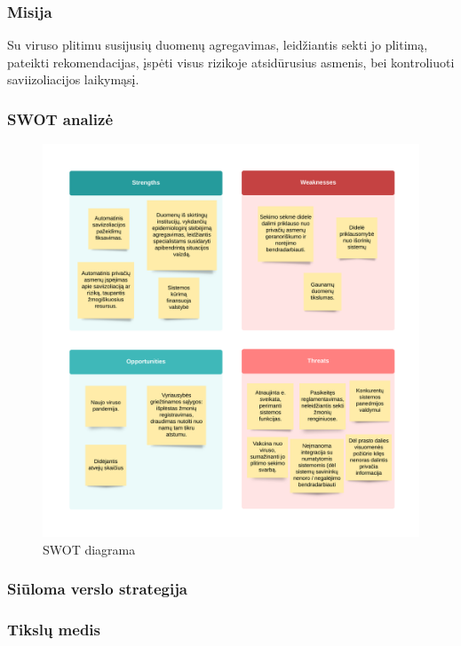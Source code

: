 \documentclass{VUMIFPSkursinis}
\begin{document}
\subsubsection{Misija}
Su viruso plitimu susijusių duomenų agregavimas, leidžiantis sekti jo plitimą, pateikti rekomendacijas,
įspėti visus rizikoje atsidūrusius asmenis, bei kontroliuoti saviizoliacijos laikymąsį.

\subsubsection{SWOT analizė}

\begin{figure}[H]
    \centering
    \includegraphics[scale=0.7]{img/SWOT.png}
    \caption{SWOT diagrama}
    \label{img:swot_diagram}
\end{figure}

\subsubsection{Siūloma verslo strategija}

\subsubsection{Tikslų medis}
\end{document}
